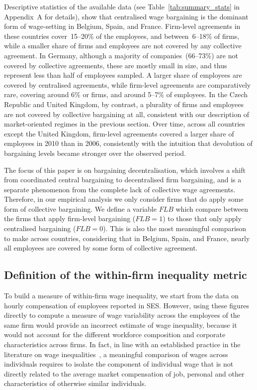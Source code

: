\documentclass[12pt]{article}
\begin{document}
Descriptive statistics of the available data (see Table~\ref{tab:summary_stats} in Appendix~A for details), show that centralised wage bargaining is the dominant form of wage-setting in Belgium, Spain, and France. Firm-level agreements in these countries cover~15--20\% of the employees, and between~6--18\% of firms, while a smaller share of firms and employees are not covered by any collective agreement. In Germany, although a majority of companies~(66--73\%) are not covered by collective agreements, these are mostly small in size, and thus represent less than half of employees sampled. A larger share of employees are covered by centralised agreements, while firm-level agreements are comparatively rare, covering around 6\% or firms, and around 5--7\% of employees. In the Czech Republic and United Kingdom, by contrast, a plurality of firms and employees are not covered by collective bargaining at all, consistent with our description of market-oriented regimes in the previous section. Over time, across all countries except the United Kingdom, firm-level agreements covered a larger share of employees in 2010 than in 2006, consistently with the intuition that devolution of bargaining levels became stronger over the observed period.

The focus of this paper is on bargaining decentralisation, which involves a shift from coordinated central bargaining to decentralised firm bargaining, and is a separate phenomenon from the complete lack of collective wage agreements. Therefore, in our empirical analysis we only consider firms that do apply some form of collective bargaining. We define a variable $\mathit{FLB}$ which compare between the firms that apply firm-level bargaining ($\mathit{FLB}=1$) to those that only apply centralised bargaining ($\mathit{FLB}=0$). This is also the most meaningful comparison to make across countries, considering that in Belgium, Spain, and France, nearly all employees are covered by some form of collective agreement.


\subsection{Definition of the within-firm inequality metric}
To build a measure of within-firm wage inequality, we start from the data on hourly compensation of employees reported in SES. However, using these figures directly to compute a measure of wage variability across the employees of the same firm would provide an incorrect estimate of wage inequality, because it would not account for the different workforce composition and corporate characteristics across firms. In fact, in line with an established practice in the literature on wage inequalities~\citep[dating at least since][]{winter.ebmer.1999}, a meaningful comparison of wages across individuals requires to isolate the component of individual wage that is not directly related to the average market compensation of job, personal and other characteristics of otherwise similar individuals.
\end{document}
